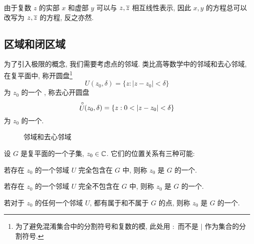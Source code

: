 由于复数 $z$ 的实部 $x$ 和虚部 $y$ 可以与 $z,\overline z$ 相互线性表示, 因此 $x,y$ 的方程总可以改写为 $z,\overline z$ 的方程, 反之亦然.


\subsection{区域和闭区域}

为了引入极限的概念, 我们需要考虑点的邻域.
类比高等数学中的邻域和去心邻域, 在复平面中, 称开圆盘\footnote{%
  为了避免混淆集合中的分割符号和复数的模, 此处用 $:$ 而不是 $\mid$ 作为集合的分割符号.%
}
\[
  U(z_0,\delta)=\{z:|z-z_0|<\delta\}
\]
为 $z_0$ 的一个 , 称去心开圆盘
\[
  \Uc(z_0,\delta)=\{z:0<|z-z_0|<\delta\}
\]
为 $z_0$ 的一个.

\begin{figure}[!htb]
  \centering
  \begin{minipage}{.4\textwidth}
    \centering
  \end{minipage}
  \begin{minipage}{.4\textwidth}
    \centering
  \end{minipage}
  \caption{邻域和去心邻域}
\end{figure}

设 $G$ 是复平面的一个子集, $z_0\in{\mathbb{C}}$.
它们的位置关系有三种可能:
\begin{enuma}
  \item 若存在 $z_0$ 的一个邻域 $U$ 完全包含在 $G$ 中, 则称 $z_0$ 是 $G$ 的一个.
  \item 若存在 $z_0$ 的一个邻域 $U$ 完全不包含在 $G$ 中, 则称 $z_0$ 是 $G$ 的一个.
  \item 若对于 $z_0$ 的任何一个邻域 $U$, 都有属于和不属于 $G$ 的点, 则称 $z_0$ 是 $G$ 的一个.
\end{enuma}

